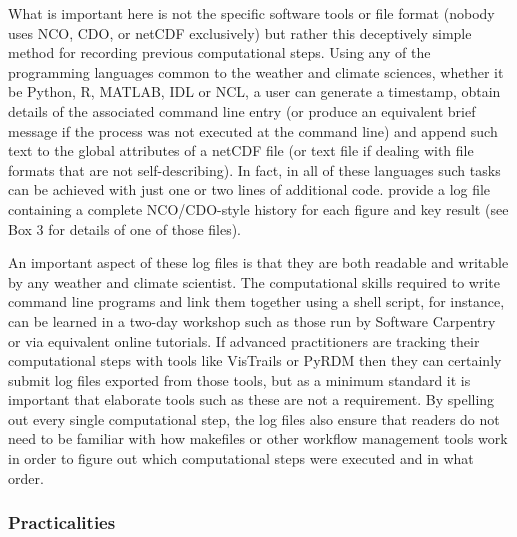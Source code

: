 What is important here is not the specific software tools or file format (nobody uses NCO, CDO, or netCDF exclusively) but rather this deceptively simple method for recording previous computational steps. Using any of the programming languages common to the weather and climate sciences, whether it be Python, R, MATLAB, IDL or NCL, a user can generate a timestamp, obtain details of the associated command line entry (or produce an equivalent brief message if the process was not executed at the command line) and append such text to the global attributes of a netCDF file (or text file if dealing with file formats that are not self-describing). In fact, in all of these languages such tasks can be achieved with just one or two lines of additional code. \citet{Irving2015} provide a log file containing a complete NCO/CDO-style history for each figure and key result (see Box 3 for details of one of those files).

An important aspect of these log files is that they are both readable and writable by any weather and climate scientist. The computational skills required to write command line programs and link them together using a shell script, for instance, can be learned in a two-day workshop such as those run by Software Carpentry \citep{Wilson2014} or via equivalent online tutorials. If advanced practitioners are tracking their computational steps with tools like VisTrails or PyRDM then they can certainly submit log files exported from those tools, but as a minimum standard it is important that elaborate tools such as these are not a requirement. By spelling out every single computational step, the log files also ensure that readers do not need to be familiar with how makefiles or other workflow management tools work in order to figure out which computational steps were executed and in what order. 

\subsubsection{Practicalities}

